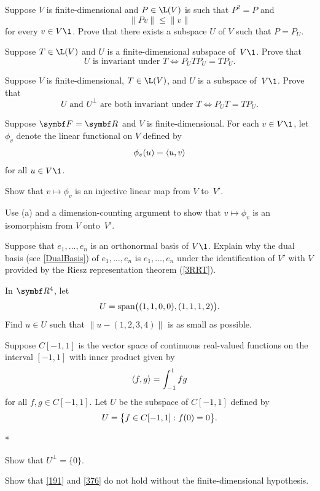 \begin{exercises}
\exercise
Suppose $V$ is finite-dimensional and $P \in \L(V)$ is such that $P^2 = P$ and
\[
\|Pv\| \le \|v\|
\]
for every $v \in V\1$.  Prove that there exists a subspace $U$ of $V$ such that $P = P_{\!U}$.


\exercise
Suppose $T \in \L(V)$ and $U$ is a finite-dimensional subspace of~$V\1$.  Prove that\label{6invP}
\[
U \text{ is invariant under } T \iff P_{\!U} T P_{\!U} = T P_{\!U}.
\]
\exercisedisplayend


\exercise
Suppose $V$ is finite-dimensional, $T \in \L(V)$, and $U$ is a subspace of~$V\1$.  Prove that
\[
U \text{ and } U^\perp \text{ are both invariant under } T \iff P_{\!U} T = T P_{\!U}.
\]
\exercisedisplayend


\exercise
Suppose $\F{} = \R{}$ and $V$ is finite-dimensional. For each $v \in V\1$, let $\phi_v$ denote the linear functional on $V$ defined by \label{VVpiso}
\[
\phi_v(u) = \langle u, v\rangle
\]
for all $u \in V\1$.
\begin{subtheorem}
\item
Show that $v \mapsto \phi_v$ is an injective linear map from $V$ to~$V'\!$.
\item
Use (a) and a dimension-counting argument to show that $v \mapsto \phi_v$ is an isomorphism from $V$ onto~$V'\!$.
\end{subtheorem}


\exercise
Suppose that $e_1, \ldots, e_n$ is an orthonormal basis of $V\1$. Explain why the dual basis (see \ref{DualBasis}) of
$e_1, \ldots, e_n$ is $e_1, \ldots, e_n$ under the identification of $V'$ with $V$ provided by the Riesz representation theorem (\ref{3RRT}).


\exercise
In $\R{4}$, let
\[
U = \operatorname{span} \bigl( (1, 1, 0, 0), (1, 1, 1, 2) \bigr).
\]
Find $u \in U$ such that $\| u - (1,2,3,4) \|$ is as small as possible.


\exercise
Suppose $C[-1, 1]$ is the vector space of continuous real-valued functions on the interval $[-1 ,1]$ with inner product given by \label{dense}
\[
\langle f, g\rangle = \int_{-1}^1 fg
\]
for all $f, g \in C[-1, 1]$. Let $U$ be the subspace of $C[-1, 1]$ defined by
\[ %
U = \br[\big]{ f \in C[-1, 1]: f(0) = 0 }.
\]
\begin{subtheorem}*
\item
Show that $U^\perp = \{0\}$.
\item
Show that \ref{191} and \ref{376} do not hold without the finite-dimensional hypothesis.
\end{subtheorem}
\exercisesubtheoremend



\end{exercises}
